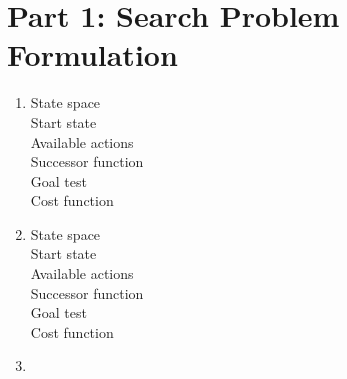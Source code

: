 \documentclass[11pt]{amsart}
\begin{document}
\maketitle

\section*{Part 1: Search Problem Formulation}

\begin{enumerate}

\item

\begin{description}

\item[State space]

\item[Start state]

\item[Available actions]

\item[Successor function]

\item[Goal test]

\item[Cost function]

\end{description}

\item

\begin{description}

\item[State space]

\item[Start state]

\item[Available actions]

\item[Successor function]

\item[Goal test]

\item[Cost function]

\end{description}

\item

\begin{description}



\end{description}
\end{enumerate}
\end{document}
